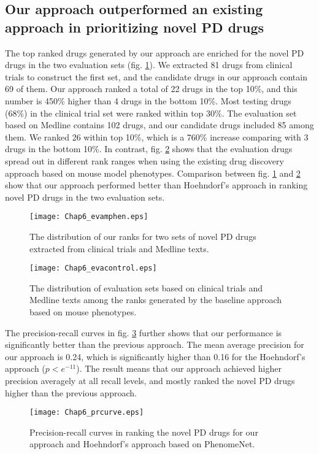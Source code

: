   \subsection{Our approach outperformed an existing approach in prioritizing novel PD drugs }
  The top ranked drugs generated by our approach are enriched for the novel PD drugs in the two evaluation sets (fig. \ref{mphen_eva}). We extracted 81 drugs from clinical trials to construct the first set, and the candidate drugs in our approach contain 69 of them. Our approach ranked a total of 22 drugs in the top 10\%, and this number is 450\% higher than 4 drugs in the bottom 10\%. Most testing drugs (68\%) in the clinical trial set were ranked within top 30\%. The evaluation set based on Medline contains 102 drugs, and our candidate drugs included 85 among them. We ranked 26 within top 10\%, which is a 760\% increase comparing with 3 drugs in the bottom 10\%. In contrast, fig. \ref{control_eva} shows that the evaluation drugs spread out in different rank ranges when using the existing drug discovery approach based on mouse model phenotypes. Comparison between fig. \ref{mphen_eva} and \ref{control_eva} show that our approach performed better than Hoehndorf's approach in ranking novel PD drugs in the two evaluation sets.
     \begin{figure}[h!]
  \begin{center}
\texttt{[image: Chap6\_evamphen.eps]}
\end{center}
  \caption{The distribution of our ranks for two sets of novel PD drugs extracted from clinical trials and Medline texts. }\label{mphen_eva}
  \end{figure}
       \begin{figure}[h!]
  \begin{center}
\texttt{[image: Chap6\_evacontrol.eps]}
\end{center}
  \caption{The distribution of evaluation sets based on clinical trials and Medline texts among the ranks generated by the baseline approach based on mouse phenotypes. }\label{control_eva}
  \end{figure}

  The precision-recall curves in fig. \ref{mphen_pr} further shows that our performance is significantly better than the previous approach. The mean average precision for our approach is 0.24, which is significantly higher than 0.16 for the Hoehndorf's approach ($p<e^{-11}$). The result means that our approach achieved higher precision averagely at all recall levels, and mostly ranked the novel PD drugs higher than the previous approach.
         \begin{figure}[h!]
  \begin{center}
\texttt{[image: Chap6\_prcurve.eps]}
\end{center}
  \caption{Precision-recall curves in ranking the novel PD drugs for our approach and Hoehndorf’s approach based on PhenomeNet. }\label{mphen_pr}
  \end{figure}

